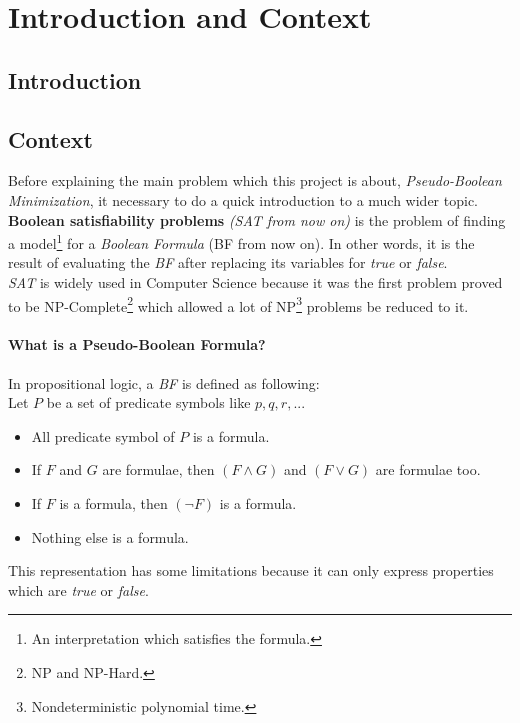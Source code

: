 \chapter{Introduction and Context}
\label{Chapter1}

\section{Introduction}

\section{Context}

Before explaining the main problem which this project is about, \emph{Pseudo-Boolean Minimization}, it necessary to do a quick introduction to a much wider topic.\\

\textbf{Boolean satisfiability problems} \textit{(SAT from now on)} is the problem of finding a model\footnote{An interpretation which satisfies the formula.} for a \emph{Boolean Formula} (BF from now on). In other words, it is the result of evaluating the \emph{BF} after replacing its variables for \emph{true} or \emph{false}. 
\\
\emph{SAT} is widely used in Computer Science because it was the first problem proved to be NP-Complete\cite{Cook1971}\footnote{NP and NP-Hard.} which allowed a lot of NP\footnote{Nondeterministic polynomial time.} problems be reduced to it.

\subsubsection{What is a Pseudo-Boolean Formula?}
In propositional logic, a \emph{BF} is defined as following\cite{Lpo}:\\
Let $P$ be a set of predicate symbols like $p,q,r,...$
\begin{itemize}
	\item All predicate symbol of $P$ is a formula.
	\item If $F$ and $G$ are formulae, then $(F \land G)$ and $(F \lor G)$ are formulae too.
	\item If $F$ is a formula, then $(\neg F)$ is a formula.
	\item Nothing else is a formula.
\end{itemize}
This representation has some limitations because it can only express properties which are \emph{true} or \emph{false}.\\


